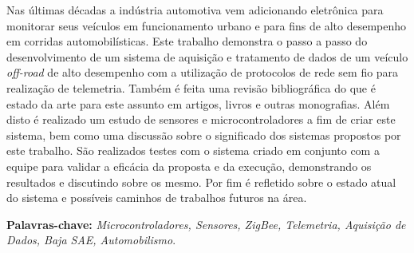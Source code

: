 


\noindent Nas últimas décadas a indústria automotiva vem adicionando eletrônica para monitorar seus veículos em funcionamento urbano e para fins de alto desempenho em corridas automobilísticas. Este trabalho demonstra o passo a passo do desenvolvimento de um sistema de aquisição e tratamento de dados de um veículo \textit{off-road} de alto desempenho com a utilização de protocolos de rede sem fio para realização de telemetria. Também é feita uma revisão bibliográfica do que é estado da arte para este assunto em artigos, livros e outras monografias. Além disto é realizado um estudo de sensores e microcontroladores a fim de criar este sistema, bem como uma discussão sobre o significado dos sistemas propostos por este trabalho. São realizados testes com o sistema criado em conjunto com a equipe para validar a eficácia da proposta e da execução, demonstrando os resultados e discutindo sobre os mesmo. Por fim é refletido sobre o estado atual do sistema e possíveis caminhos de trabalhos futuros na área.


\textbf{Palavras-chave:} \textit{Microcontroladores, Sensores, ZigBee, Telemetria, Aquisição de Dados, Baja SAE, Automobilismo}.



